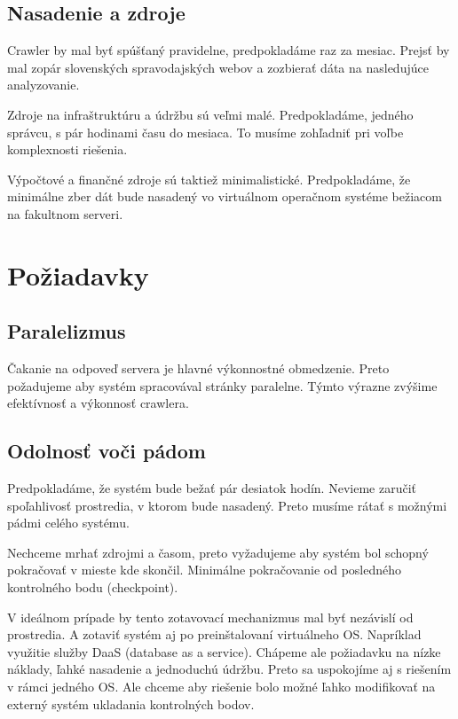 \subsection{Nasadenie a zdroje}
Crawler by mal byť spúšťaný pravidelne, predpokladáme raz za mesiac. Prejsť by mal zopár slovenských spravodajských webov a zozbierať dáta na nasledujúce analyzovanie. 

Zdroje na infraštruktúru a údržbu sú veľmi malé. Predpokladáme, jedného správcu, s pár hodinami času do mesiaca. To musíme zohľadniť pri voľbe komplexnosti riešenia. 

Výpočtové a finančné zdroje sú taktiež minimalistické. Predpokladáme, že minimálne zber dát bude nasadený vo virtuálnom operačnom systéme bežiacom na fakultnom serveri. 



\section{Požiadavky}

\subsection{Paralelizmus}
Čakanie na odpoveď servera je hlavné výkonnostné obmedzenie. Preto požadujeme aby systém spracovával stránky paralelne. Týmto výrazne zvýšime efektívnosť a výkonnosť crawlera. 

\subsection{Odolnosť voči pádom} \label{sec:reqFailRecovery}
Predpokladáme, že systém bude bežať pár desiatok hodín. Nevieme zaručiť spoľahlivosť prostredia, v ktorom bude nasadený. Preto musíme rátať s možnými pádmi celého systému. 

Nechceme mrhať zdrojmi a časom, preto vyžadujeme aby systém bol schopný pokračovať v mieste kde skončil. Minimálne pokračovanie od posledného kontrolného bodu (checkpoint).

V ideálnom prípade by tento zotavovací mechanizmus mal byť nezávislí od prostredia. A zotaviť systém aj po preinštalovaní virtuálneho OS. Napríklad využitie služby DaaS (database as a service). Chápeme ale požiadavku na nízke náklady, ľahké nasadenie a jednoduchú údržbu. Preto sa uspokojíme aj s riešením v rámci jedného OS. Ale chceme aby riešenie bolo možné ľahko modifikovať na externý systém ukladania kontrolných bodov.

